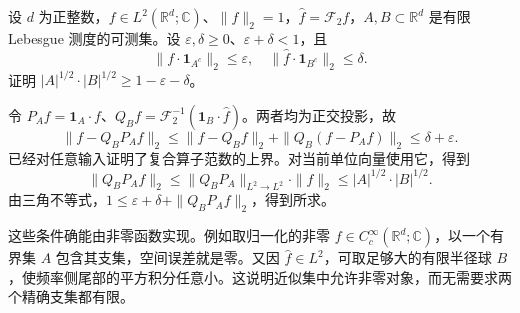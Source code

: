 \begin{optionalexercise}\label{b2:ex:04-approximate-support}
设 \(d\) 为正整数，\(f\in L^2(\mathbb R^d;\mathbb C)\)、\(\|f\|_2=1\)，\(\widehat f=\mathcal F_2f\)，\(A,B\subset\mathbb R^d\) 是有限 Lebesgue 测度的可测集。设 \(\varepsilon,\delta\geq0\)、\(\varepsilon+\delta<1\)，且
\[
 \|f\cdot\mathbf1_{A^c}\|_2\leq\varepsilon,
 \quad\|\widehat f\cdot\mathbf1_{B^c}\|_2\leq\delta.
\]
证明 \(|A|^{1/2}\cdot|B|^{1/2}\geq1-\varepsilon-\delta\)。
\end{optionalexercise}
\begin{solution}
令 \(P_Af=\mathbf1_A\cdot f\)、\(Q_Bf=\mathcal F_2^{-1}(\mathbf1_B\cdot\widehat f)\)。两者均为正交投影，故
\[
 \|f-Q_BP_Af\|_2
 \leq\|f-Q_Bf\|_2+\|Q_B(f-P_Af)\|_2\leq\delta+\varepsilon.
\]
已经对任意输入证明了复合算子范数的上界。对当前单位向量使用它，得到
\[
 \|Q_BP_Af\|_2
 \leq\|Q_BP_A\|_{L^2\to L^2}\cdot\|f\|_2
 \leq|A|^{1/2}\cdot|B|^{1/2}.
\]
由三角不等式，\(1\leq\varepsilon+\delta+\|Q_BP_Af\|_2\)，得到所求。

这些条件确能由非零函数实现。例如取归一化的非零 \(f\in C_c^\infty(\mathbb R^d;\mathbb C)\)，以一个有界集 \(A\) 包含其支集，空间误差就是零。又因 \(\widehat f\in L^2\)，可取足够大的有限半径球 \(B\)，使频率侧尾部的平方积分任意小。这说明近似集中允许非零对象，而无需要求两个精确支集都有限。
\end{solution}

